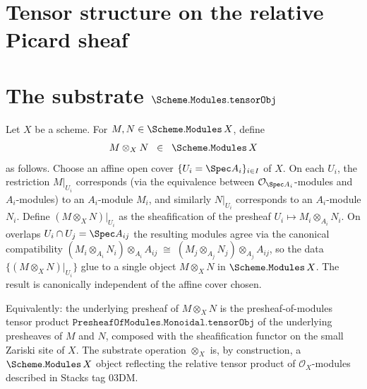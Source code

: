 \section{Tensor structure on the relative Picard sheaf}
\label{mk-chap:Picard_TensorObjSubstrate}

\section{The substrate \(\Scheme.\mathtt{Modules}.\mathtt{tensorObj}\)}
\label{mk-sec:tensorobj_substrate}
\label{mk-sec:tensorobj_api_survey}

\begin{definition}\label{mk-def:scheme_modules_tensorobj}
  \leanok

  Let \(X\) be a scheme. For
  \(M, N \in \Scheme.\mathtt{Modules}\,X\), define
  \[
    M \otimes_X N \;\;\in\;\; \Scheme.\mathtt{Modules}\,X
  \]
  as follows. Choose an affine open cover \(\{U_i = \Spec A_i\}_{i \in I}\)
  of \(X\). On each \(U_i\), the restriction
  \(M|_{U_i}\) corresponds (via the equivalence between
  \(\mathcal{O}_{\Spec A_i}\)-modules and \(A_i\)-modules) to an
  \(A_i\)-module \(M_i\), and similarly
  \(N|_{U_i}\) corresponds to an \(A_i\)-module \(N_i\). Define
  \((M \otimes_X N)|_{U_i}\) as the sheafification of the presheaf
  \(U_i \mapsto M_i \otimes_{A_i} N_i\). On overlaps
  \(U_i \cap U_j = \Spec A_{ij}\) the resulting modules agree via the
  canonical compatibility
  \((M_i \otimes_{A_i} N_i) \otimes_{A_i} A_{ij}
     \;\cong\;
     (M_j \otimes_{A_j} N_j) \otimes_{A_j} A_{ij}\),
  so the data \(\{(M \otimes_X N)|_{U_i}\}\) glue to a single object
  \(M \otimes_X N\) in \(\Scheme.\mathtt{Modules}\,X\). The result is
  canonically independent of the affine cover chosen.

  Equivalently: the underlying presheaf of \(M \otimes_X N\) is the
  presheaf-of-modules tensor product
  \(\mathtt{PresheafOfModules.Monoidal.tensorObj}\) of the underlying
  presheaves of \(M\) and \(N\), composed with the sheafification
  functor on the small Zariski site of \(X\). The substrate operation
  \(\otimes_X\) is, by construction, a \(\Scheme.\mathtt{Modules}\,X\)
  object reflecting the relative tensor product of
  \(\mathcal{O}_X\)-modules described in Stacks tag 03DM.
\end{definition}

